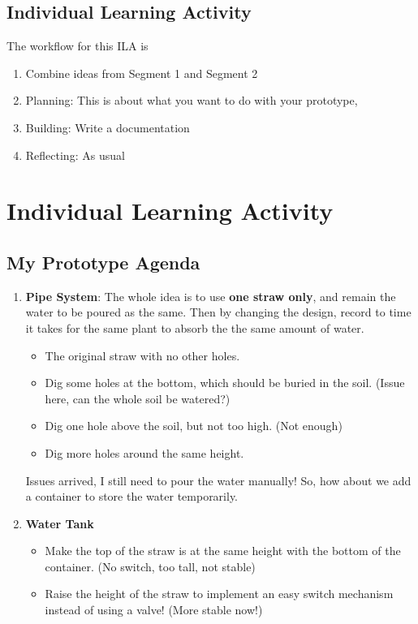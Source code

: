 \documentclass[math,code]{amznotes}
\theoremstyle{remark}
\begin{document}
\subsection{Individual Learning Activity}
The workflow for this ILA is
\begin{enumerate}
    \item Combine ideas from Segment 1 and Segment 2
    \item Planning: This is about what you want to do with your prototype, 
    \item Building: Write a documentation
    \item Reflecting: As usual
\end{enumerate}

\section{Individual Learning Activity}
\subsection{My Prototype Agenda}
\begin{enumerate}
    \item \textbf{Pipe System}:
    The whole idea is to use \textbf{one straw only}, and remain the water to be poured as the same. Then by changing the design, record to time it takes for the same plant to absorb the the same amount of water.
    \begin{itemize}
        \item The original straw with no other holes.
        \item Dig some holes at the bottom, which should be buried in the soil. (Issue here, can the whole soil be watered?)
        \item Dig one hole above the soil, but not too high. (Not enough)
        \item Dig more holes around the same height. 
    \end{itemize}
    Issues arrived, I still need to pour the water manually! So, how about we add a container to store the water temporarily.
    \item \textbf{Water Tank}
    \begin{itemize}
        \item Make the top of the straw is at the same height with the bottom of the container. (No switch, too tall, not stable)
        \item Raise the height of the straw to implement an easy switch mechanism instead of using a valve! (More stable now!)
    \end{itemize}
\end{enumerate}
\end{document}
